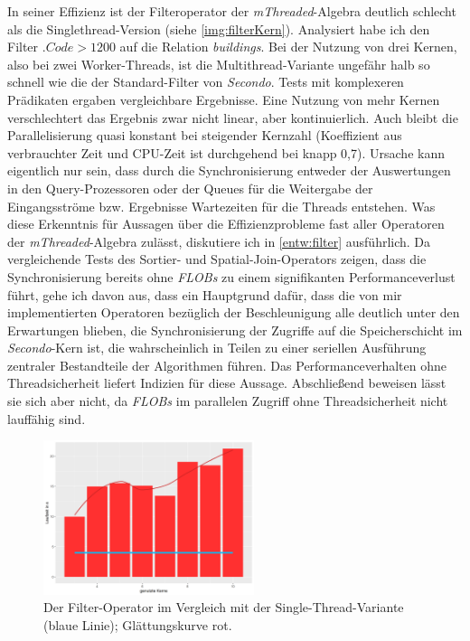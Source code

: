 \documentclass[a4paper,12pt,twoside]{article}
\newcommand{\Fb}[1]{\textit{#1}} %
\begin{document}
In seiner Effizienz ist der Filteroperator der \Fb{mThreaded}-Algebra deutlich schlecht als die Singlethread-Version (siehe \autoref{img:filterKern}). Analysiert habe ich den Filter $.Code > 1200$ auf die Relation \Fb{buildings}. Bei der Nutzung von drei Kernen, also bei zwei Worker-Threads, ist die Multithread-Variante ungefähr halb so schnell wie die der Standard-Filter von \Fb{Secondo}. Tests mit komplexeren Prädikaten ergaben vergleichbare Ergebnisse. Eine Nutzung von mehr Kernen verschlechtert das Ergebnis zwar nicht linear, aber kontinuierlich. Auch bleibt die Parallelisierung quasi konstant bei steigender Kernzahl (Koeffizient aus verbrauchter Zeit und CPU-Zeit ist durchgehend bei knapp 0,7). Ursache kann eigentlich nur sein, dass durch die Synchronisierung entweder der Auswertungen in den Query-Prozessoren oder der Queues für die Weitergabe der Eingangsströme bzw. Ergebnisse  Wartezeiten für die Threads entstehen. Was diese Erkenntnis für Aussagen über die Effizienzprobleme fast aller Operatoren der \Fb{mThreaded}-Algebra zulässt, diskutiere ich in \autoref{entw:filter} ausführlich. Da vergleichende Tests des Sortier- und Spatial-Join-Operators zeigen, dass die Synchronisierung bereits ohne \Fb{FLOBs} zu einem signifikanten Performanceverlust führt, gehe ich davon aus, dass ein Hauptgrund dafür, dass die von mir implementierten Operatoren bezüglich der Beschleunigung alle deutlich unter den Erwartungen blieben, die Synchronisierung der Zugriffe auf die Speicherschicht im \Fb{Secondo}-Kern ist, die wahrscheinlich in Teilen zu einer seriellen Ausführung zentraler Bestandteile der Algorithmen führen. Das Performanceverhalten ohne Threadsicherheit liefert Indizien für diese Aussage. Abschließend beweisen lässt sie sich aber nicht, da \Fb{FLOBs} im parallelen Zugriff ohne Threadsicherheit nicht lauffähig sind.  

\begin{figure}
	\centering
	\includegraphics[width=0.55\textwidth]{Bilder/filter_kerne.png}
	\caption{Der Filter-Operator im Vergleich mit der Single-Thread-Variante (blaue Linie); Glättungskurve rot.}
	\label{img:filterKern}
\end{figure}
\end{document}
